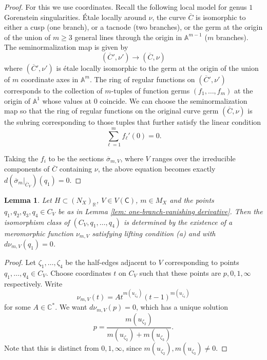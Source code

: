 \documentclass{article}
\newtheorem{lemma}[definition]{Lemma}
\newcommand{\tropC}{\mathsf{C}}
\begin{document}
\begin{proof}
For this we use coordinates. Recall the following local model for genus $1$ Gorenstein singularities. Étale locally around $\nu$, the curve $\overline{C}$ is isomorphic to either a cusp (one branch), or a tacnode (two branches), or the germ at the origin of the union of $m \geq 3$ general lines through the origin in $\mathbb{A}^{m-1}$ ($m$ branches). The seminormalization map is given by
\begin{equation}\label{eqn: seminormalization}
(\overline{C}',\nu') \to (\overline{C},\nu)
\end{equation}
where $(\overline{C}',\nu')$ is étale locally isomorphic to the germ at the origin of the union of $m$ coordinate axes in $\mathbb{A}^m$. The ring of regular functions on $(\overline{C}',\nu')$ corresponds to the collection of $m$-tuples of function germs $(f_1,\ldots,f_m)$ at the origin of $\mathbb{A}^1$ whose values at $0$ coincide. We can choose the seminormalization map so that the ring of regular functions on the original curve germ $(\overline{C},\nu)$ is the subring corresponding to those tuples that further satisfy the linear condition
\begin{equation}\label{eqn: regular_fcts_barC}
\sum_{\ell=1}^{m}  f_\ell'(0) = 0.
\end{equation}

Taking the $f_i$ to be the sections $\overline{\sigma}_{m,V}$, where $V$ ranges over the irreducible components of $\overline{C}$ containing $\nu$, the above equation becomes exactly $d(\overline{\sigma}_m|_{\overline{C}_V})(q_1)=0$.
\end{proof}

\begin{lemma} \label{lem: one-branch}
Let $H \subset (N_X)_\mathbb{R}$, $V \in V(\tropC)$, $m \in M_X$ and the points $q_1,q_2,q_3,q_4 \in C_V$ be as in Lemma \ref{lem: one-branch-vanishing derivative}. Then the isomorphism class of $(C_V, q_1, \ldots, q_4)$ is determined by the existence of a meromorphic function $\nu_{m,V}$ satisfying lifting condition (a) and with $d\nu_{m,V}(q_1) = 0$.
\end{lemma}





\begin{proof}
    Let $\zeta_1, \ldots,  \zeta_4$ be the half-edges adjacent to $V$ corresponding to points $q_1, \ldots, q_4 \in C_V$. Choose coordinates $t$ on $C_V$ such that these points are $p, 0, 1, \infty$ respectively. Write
    $$\nu_{m, V} (t)= At^{m(u_{\zeta_2})}(t-1)^{m(u_{\zeta_3})}$$
    for some $A \in \mathbb{C}^*$. We want $d\nu_{m, V}(p) = 0$, which has a unique solution
    $$p = \frac{m(u_{\zeta_2})}{m(u_{\zeta_2}) + m(u_{\zeta_3})}.$$
    Note that this is distinct from $0, 1, \infty$, since $m(u_{\zeta_2}), m(u_{\zeta_3}) \neq 0$. 
\end{proof}
\end{document}
